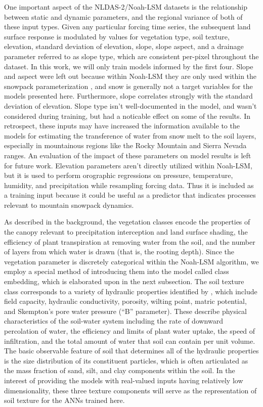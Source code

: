One important aspect of the NLDAS-2/Noah-LSM datasets is the relationship between static and dynamic parameters, and the regional variance of both of these input types. Given any particular forcing time series, the subsequent land surface response is modulated by values for vegetation type, soil texture, elevation, standard deviation of elevation, slope, slope aspect, and a drainage parameter referred to as slope type, which are consistent per-pixel throughout the dataset. In this work, we will only train models informed by the first four. Slope and aspect were left out because within Noah-LSM they are only used within the snowpack parameterization \citep{barlage_noah_2010}, and snow is generally not a target variables for the models presented here. Furthermore, slope correlates strongly with the standard deviation of elevation. Slope type isn't well-documented in the model, and wasn't considered during training, but had a noticable effect on some of the results. In retrospect, these inputs may have increased the information available to the models for estimating the transference of water from snow melt to the soil layers, especially in mountainous regions like the Rocky Mountain and Sierra Nevada ranges. An evaluation of the impact of these parameters on model results is left for future work. Elevation parameters aren't directly utilized within Noah-LSM, but it is used to perform orographic regressions on pressure, temperature, humidity, and precipitation while resampling forcing data. Thus it is included as a training input because it could be useful as a predictor that indicates processes relevant to mountain snowpack dynamics.

As described in the background, the vegetation classes encode the properties of the canopy relevant to precipitation interception and land surface shading, the efficiency of plant transpiration at removing water from the soil, and the number of layers from which water is drawn (that is, the rooting depth). Since the vegetation parameter is discretely categorical within the Noah-LSM algorithm, we employ a special method of introducing them into the model called class embedding, which is elaborated upon in the next subsection.  The soil texture class corresponds to a variety of hydraulic properties identified by \citep{cosby_statistical_1984}, which include field capacity, hydraulic conductivity, porosity, wilting point, matric potential, and Skempton's pore water pressure (``B'' parameter). These describe physical characteristics of the soil-water system including the rate of downward percolation of water, the efficiency and limits of plant water uptake, the speed of infiltration, and the total amount of water that soil can contain per unit volume. The basic observable feature of soil that determines all of the hydraulic properties is the size distribution of its constituent particles, which is often articulated as the mass fraction of sand, silt, and clay components within the soil. In the interest of providing the models with real-valued inputs having relatively low dimensionality, these three texture components will serve as the representation of soil texture for the ANNs trained here.

